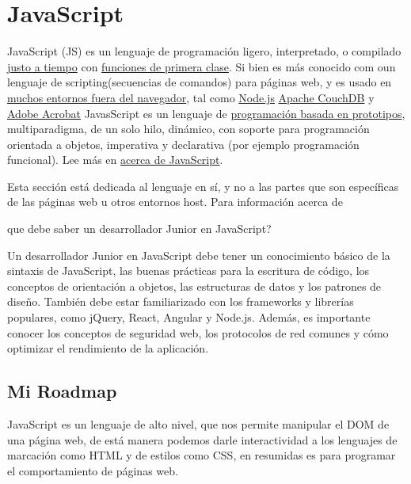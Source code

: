 \part{JavaScript}

JavaScript (JS) es un lenguaje de programaci\'on ligero, interpretado, o compilado 
\href{https://es.wikipedia.org/wiki/Compilaci%C3%B3n_en_tiempo_de_ejecuci%C3%B3n}{\blue justo a tiempo}
con \href{https://developer.mozilla.org/es/docs/Glossary/First-class_Function}{\blue funciones de primera clase}.
Si bien es m\'as conocido com oun lenguaje de scripting(secuencias de comandos) para p\'aginas web, y es usado en 
\href{https://es.wikipedia.org/wiki/JavaScript}{\blue muchos entornos fuera del navegador}, tal como 
\href{https://developer.mozilla.org/es/docs/Glossary/Node.js}{\blue Node.js} 
\href{https://couchdb.apache.org/}{\blue Apache CouchDB} y \href{https://opensource.adobe.com/dc-acrobat-sdk-docs/acrobatsdk/}{\blue Adobe Acrobat}
JavasScript es un lenguaje de \href{https://developer.mozilla.org/es/docs/Glossary/Prototype-based_programming}{\blue programaci\'on basada en prototipos}, multiparadigma, de un solo hilo, din\'amico, con soporte para 
programaci\'on orientada a objetos, imperativa y declarativa (por ejemplo programaci\'on funcional). Lee m\'as en \href{https://developer.mozilla.org/es/docs/conflicting/Web/JavaScript}{\blue acerca de JavaScript}.

Esta secci\'on est\'a dedicada al lenguaje en s\'i, y no a las partes que son espec\'ificas de las p\'aginas web u otros entornos host. Para informaci\'on acerca de 

que debe saber un desarrollador Junior en JavaScript?

Un desarrollador Junior en JavaScript debe tener un conocimiento b\'asico de la sintaxis de JavaScript, las buenas pr\'acticas para la escritura de c\'odigo, los conceptos de orientaci\'on a objetos, las estructuras de datos y los patrones de dise\~no. Tambi\'en debe estar familiarizado con los frameworks y librerías populares, como jQuery, React, Angular y Node.js. Adem\'as, es importante conocer los conceptos de seguridad web, los protocolos de red comunes y c\'omo optimizar el rendimiento de la aplicaci\'on.

\chapter{Mi Roadmap}
JavaScript es un lenguaje de alto nivel, que nos permite manipular el DOM de una p\'agina web, 
de est\'a manera podemos darle interactividad a los lenguajes de marcaci\'on como HTML y de estilos como CSS, en resumidas es para programar el comportamiento de p\'aginas web.

